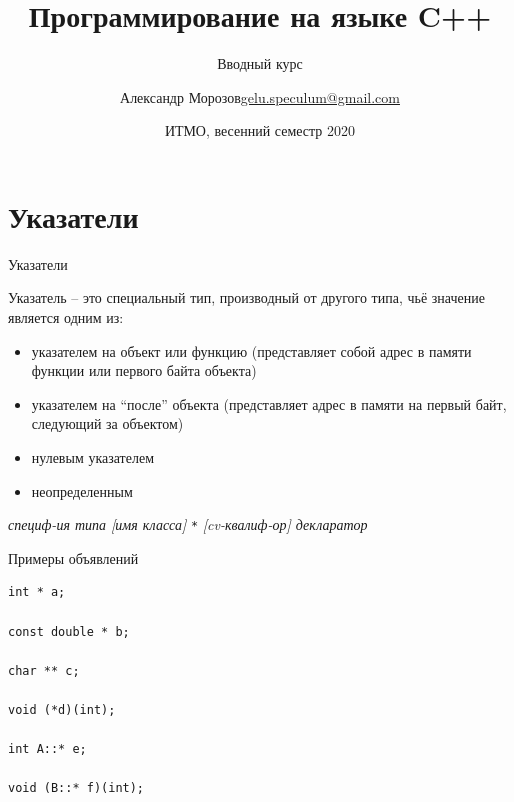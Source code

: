 \documentclass[unknownkeysallowed,xcolor=table]{beamer}
\title[C++]
{Программирование на языке C++}
\subtitle{Вводный курс}
\author[А.~Б.~Морозов]
{
  \texorpdfstring{Александр Морозов\newline\href{mailto:gelu.speculum@gmail.com}{gelu.speculum@gmail.com}}
  {Александр Морозов}
}
\date[ITMO 2020]
{ИТМО, весенний семестр 2020}
\begin{document}
\frame{\titlepage}


\section{Указатели}

\begin{frame}[fragile]{Указатели}

Указатель -- это специальный тип, производный от другого типа, чьё значение является одним из:

\vspace{0.7em}

\begin{itemize}
  \item указателем на объект или функцию (представляет собой адрес в памяти функции или первого байта объекта) \vspace{0.5em}
  \item указателем на ``после'' объекта (представляет адрес в памяти на первый байт, следующий за объектом) \vspace{0.5em}
  \item нулевым указателем \vspace{0.5em}
  \item неопределенным
\end{itemize}

\vspace{1.5em}

\emph{специф-ия типа [имя класса]} \lstinline{*} \emph{[cv-квалиф-ор] декларатор} 

\end{frame}

\begin{frame}[fragile]{Примеры объявлений}

\begin{lstlisting}
int * a;

const double * b;

char ** c;

void (*d)(int);

int A::* e;

void (B::* f)(int);
\end{lstlisting}

\end{frame}
\end{document}
